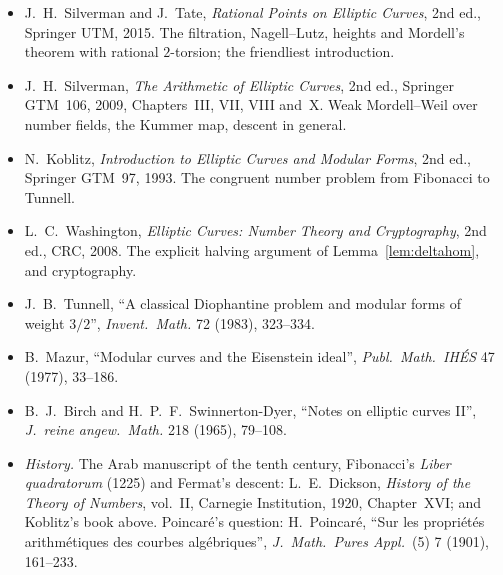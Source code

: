 \begin{itemize}
\item J.~H.~Silverman and J.~Tate, \emph{Rational Points on Elliptic Curves}, 2nd ed., Springer UTM, 2015. The filtration, Nagell--Lutz, heights and Mordell's
theorem with rational $2$-torsion; the friendliest introduction.
\item J.~H.~Silverman, \emph{The Arithmetic of Elliptic Curves}, 2nd ed., Springer GTM~106, 2009, Chapters~III, VII, VIII and~X. Weak Mordell--Weil over number fields,
the Kummer map, descent in general.
\item N.~Koblitz, \emph{Introduction to Elliptic Curves and Modular Forms}, 2nd ed., Springer GTM~97, 1993. The congruent number problem from Fibonacci to Tunnell.
\item L.~C.~Washington, \emph{Elliptic Curves: Number Theory and Cryptography}, 2nd ed., CRC, 2008. The explicit halving argument of Lemma~\ref{lem:deltahom}, and
cryptography.
\item J.~B.~Tunnell, ``A classical Diophantine problem and modular forms of weight $3/2$'', \emph{Invent.\ Math.} 72 (1983), 323--334.
\item B.~Mazur, ``Modular curves and the Eisenstein ideal'', \emph{Publ.\ Math.\ IH\'ES} 47 (1977), 33--186.
\item B.~J.~Birch and H.~P.~F.~Swinnerton-Dyer, ``Notes on elliptic curves II'', \emph{J.\ reine angew.\ Math.} 218 (1965), 79--108.
\item \emph{History.} The Arab manuscript of the tenth century, Fibonacci's \emph{Liber quadratorum} (1225) and Fermat's
descent: L.~E.~Dickson, \emph{History of the Theory of Numbers}, vol.~II, Carnegie Institution, 1920, Chapter~XVI; and
Koblitz's book above. Poincar\'e's question: H.~Poincar\'e, ``Sur les propri\'et\'es arithm\'etiques des courbes
alg\'ebriques'', \emph{J.\ Math.\ Pures Appl.}\ (5) 7 (1901), 161--233.
\end{itemize}
